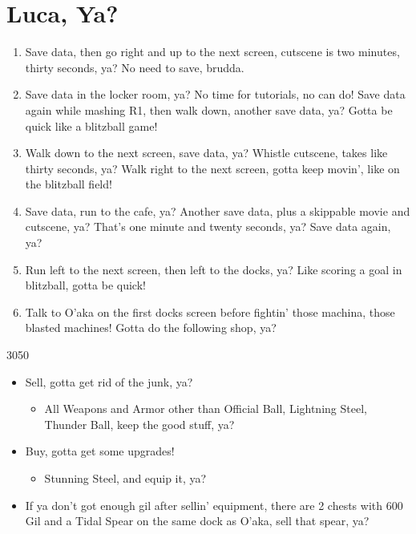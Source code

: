 \chapter{Luca, Ya?}

\begin{enumerate}
    \item Save data, then go right and up to the next screen, cutscene is two minutes, thirty seconds, ya? No need to save, brudda.
    \item Save data in the locker room, ya? No time for tutorials, no can do! Save data again while mashing R1, then walk down, another save data, ya? Gotta be quick like a blitzball game!
    \item Walk down to the next screen, save data, ya? Whistle cutscene, takes like thirty seconds, ya? Walk right to the next screen, gotta keep movin', like on the blitzball field!
    \item Save data, run to the cafe, ya? Another save data, plus a skippable movie and cutscene, ya? That's one minute and twenty seconds, ya? Save data again, ya?
    \item Run left to the next screen, then left to the docks, ya? Like scoring a goal in blitzball, gotta be quick!
    \item Talk to O'aka on the first docks screen before fightin' those machina, those blasted machines! Gotta do the following shop, ya?
\end{enumerate}
\begin{shop}{3050}
    \begin{itemize}
        \item Sell, gotta get rid of the junk, ya?
        \begin{itemize}
            \item All Weapons and Armor other than Official Ball, Lightning Steel, Thunder Ball, keep the good stuff, ya?
        \end{itemize}
        \item Buy, gotta get some upgrades!
        \begin{itemize}
            \item Stunning Steel, and equip it, ya?
        \end{itemize}
        \item If ya don't got enough gil after sellin' equipment, there are 2 chests with 600 Gil and a Tidal Spear on the same dock as O'aka, sell that spear, ya?
    \end{itemize}
\end{shop}
